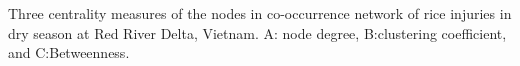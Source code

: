 Three centrality measures of the nodes in co-occurrence network of rice injuries in dry season at Red River Delta, Vietnam. A: node degree, B:clustering coefficient, and C:Betweenness.
        \label{fig:nodepropRR_ds}